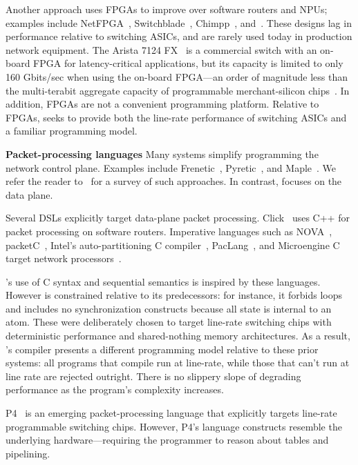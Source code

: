 Another approach uses FPGAs to improve over software routers and NPUs; examples
include NetFPGA~\cite{netfpga}, Switchblade~\cite{switchblade},
Chimpp~\cite{chimpp}, and~\cite{silver_bullet}. These designs lag in
performance relative to switching ASICs, and are rarely used today in
production network equipment. The Arista 7124 FX~\cite{7124fx} is a commercial
switch with an on-board FPGA for latency-critical applications, but its
capacity is limited to only 160 Gbits/sec when using the on-board FPGA---an
order of magnitude less than the multi-terabit aggregate capacity of
programmable merchant-silicon chips~\cite{xpliant}. In addition, FPGAs are not
a convenient programming platform. Relative to FPGAs, \pktlanguage seeks to
provide both the line-rate performance of switching ASICs and a familiar
programming model.

\textbf{Packet-processing languages}
Many systems simplify programming the network control plane. Examples include
Frenetic~\cite{frenetic}, Pyretic~\cite{pyretic}, and Maple~\cite{maple}. We
refer the reader to~\cite{language_survey} for a survey of such approaches.  In
contrast, \pktlanguage focuses on the data plane.

Several DSLs explicitly target data-plane packet processing. Click~\cite{click}
uses C++ for packet processing on software routers. Imperative
languages such as NOVA~\cite{nova}, packetC~\cite{packetc}, Intel's
auto-partitioning C compiler~\cite{intel_uiuc_pldi}, PacLang~\cite{paclang_lang,
paclang_partitioner}, and Microengine C~\cite{microenginec, intel_ixa} target
network processors~\cite{ixp2800, ixp4xx}.

\pktlanguage's use of C syntax and sequential semantics is inspired by these
languages. However \pktlanguage is constrained relative to its predecessors:
for instance, it forbids loops and includes no synchronization constructs
because all state is internal to an atom. These were deliberately chosen to
target line-rate switching chips with deterministic performance and
shared-nothing memory architectures.  As a result, \pktlanguage's compiler
presents a different programming model relative to these prior systems: all
\pktlanguage programs that compile run at line-rate, while those that can't run
at line rate are rejected outright. There is no slippery slope of degrading
performance as the program's complexity increases.

P4~\cite{p4} is an emerging packet-processing language that explicitly targets
line-rate programmable switching chips. However, P4's language constructs
resemble the underlying hardware---requiring the programmer to reason about
tables and pipelining.

